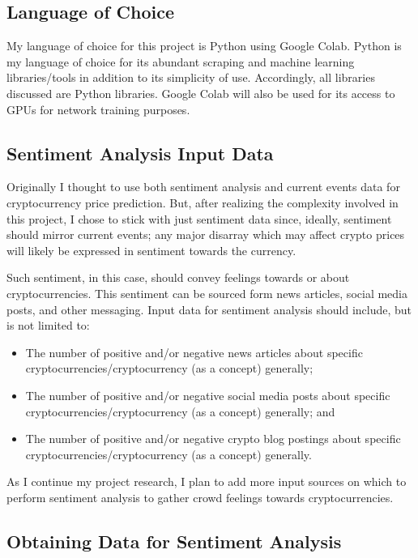 \documentclass[10pt,twocolumn]{article}
\begin{document}
\subsection{Language of Choice}

My language of choice for this project is Python using Google Colab. Python is my language of choice for its abundant scraping and machine learning libraries/tools in addition to its simplicity of use. Accordingly, all libraries discussed are Python libraries. Google Colab will also be used for its access to GPUs for network training purposes.

\subsection{Sentiment Analysis Input Data}

Originally I thought to use both sentiment analysis and current events data for cryptocurrency price prediction. But, after realizing the complexity involved in this project, I chose to stick with just sentiment data since, ideally, sentiment should mirror current events; any major disarray which may affect crypto prices will likely be expressed in sentiment towards the currency.

Such sentiment, in this case, should convey feelings towards or about cryptocurrencies. This sentiment can be sourced form news articles, social media posts, and other messaging. Input data for sentiment analysis should include, but is not limited to:

\begin{itemize}
    \item The number of positive and/or negative news articles about specific cryptocurrencies/cryptocurrency (as a concept) generally;
    \item The number of positive and/or negative social media posts about specific cryptocurrencies/cryptocurrency (as a concept) generally; and
    \item The number of positive and/or negative crypto blog postings about specific cryptocurrencies/cryptocurrency (as a concept) generally.
\end{itemize}

As I continue my project research, I plan to add more input sources on which to perform sentiment analysis to gather crowd feelings towards cryptocurrencies.

\subsection{Obtaining Data for Sentiment Analysis}
\end{document}
